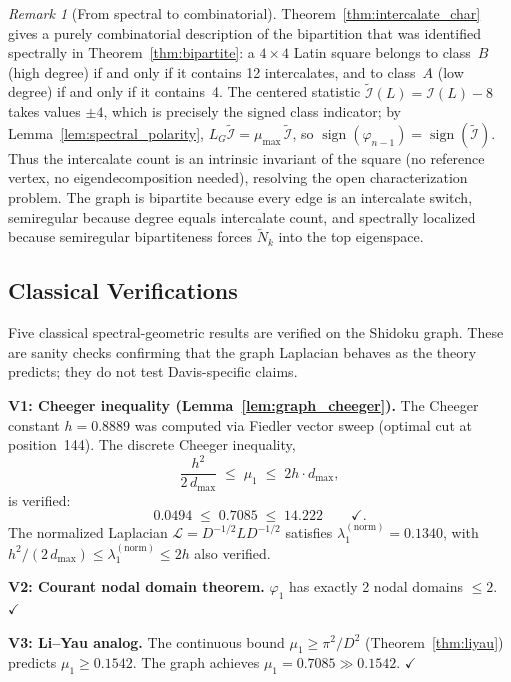 \documentclass[11pt]{article}
\theoremstyle{definition}
\theoremstyle{remark}
\newtheorem{remark}[theorem]{Remark}
\newcommand{\Ic}{\mathcal{I}}
\begin{document}
\begin{remark}[From spectral to combinatorial]\label{rem:spectral_to_comb}
Theorem~\ref{thm:intercalate_char} gives a purely combinatorial description of the bipartition that was identified spectrally in Theorem~\ref{thm:bipartite}: a $4 \times 4$ Latin square belongs to class~$B$ (high degree) if and only if it contains 12 intercalates, and to class~$A$ (low degree) if and only if it contains~4.  The centered statistic $\widetilde{\Ic}(L) = \Ic(L) - 8$ takes values $\pm 4$, which is precisely the signed class indicator; by Lemma~\ref{lem:spectral_polarity}, $L_G \widetilde{\Ic} = \mu_{\max}\, \widetilde{\Ic}$, so $\operatorname{sign}(\varphi_{n-1}) = \operatorname{sign}(\widetilde{\Ic})$.  Thus the intercalate count is an intrinsic invariant of the square (no reference vertex, no eigendecomposition needed), resolving the open characterization problem.  The graph is bipartite because every edge is an intercalate switch, semiregular because degree equals intercalate count, and spectrally localized because semiregular bipartiteness forces $\tilde{N}_k$ into the top eigenspace.
\end{remark}


\subsection{Classical Verifications}

Five classical spectral-geometric results are verified on the Shidoku graph. These are sanity checks confirming that the graph Laplacian behaves as the theory predicts; they do not test Davis-specific claims.

\textbf{V1: Cheeger inequality (Lemma~\ref{lem:graph_cheeger}).} The Cheeger constant $h = 0.8889$ was computed via Fiedler vector sweep (optimal cut at position~144). The discrete Cheeger inequality,
\[
\frac{h^2}{2\,d_{\max}} \;\le\; \mu_1 \;\le\; 2h \cdot d_{\max},
\]
is verified:
\[
0.0494 \;\le\; 0.7085 \;\le\; 14.222 \qquad\checkmark.
\]
The normalized Laplacian $\mathcal{L} = D^{-1/2}LD^{-1/2}$ satisfies $\lambda_1^{(\mathrm{norm})} = 0.1340$, with $h^2/(2\,d_{\max}) \le \lambda_1^{(\mathrm{norm})} \le 2h$ also verified.

\textbf{V2: Courant nodal domain theorem.} $\varphi_1$ has exactly 2 nodal domains $\le 2$. $\checkmark$

\textbf{V3: Li--Yau analog.} The continuous bound $\mu_1 \ge \pi^2/D^2$ (Theorem~\ref{thm:liyau}) predicts $\mu_1 \ge 0.1542$. The graph achieves $\mu_1 = 0.7085 \gg 0.1542$. $\checkmark$
\end{document}
